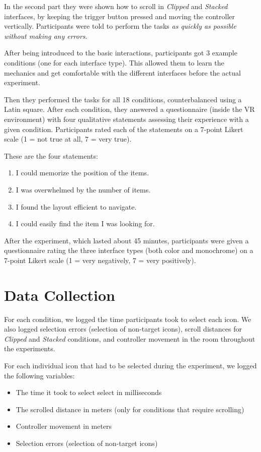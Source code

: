 \documentclass[nobib]{tufte-book} %
\begin{document}
In the second part they were shown how to scroll in \emph{Clipped} and \emph{Stacked} interfaces, by keeping the trigger button pressed and moving the controller vertically.
Participants were told to perform the tasks \emph{as quickly as possible without making any errors}.

After being introduced to the basic interactions, participants got 3 example conditions (one for each interface type). This allowed them to learn the mechanics and get comfortable with the different interfaces before the actual experiment.

Then they performed the tasks for all 18 conditions, counterbalanced using a Latin square. After each condition, they answered a questionnaire (inside the VR environment) with four qualitative statements assessing their experience with a given condition. Participants rated each of the statements on a 7-point Likert scale (1 = not true at all, 7 = very true).

These are the four statements:

\begin{enumerate}[label=\arabic*. , wide=0.5em,  leftmargin=*]
  \item I could memorize the position of the items.
  \item I was overwhelmed by the number of items.
  \item I found the layout efficient to navigate.
  \item I could easily find the item I was looking for.
\end{enumerate}

After the experiment, which lasted about 45 minutes, participants were given a questionnaire rating the three interface types (both color and monochrome) on a 7-point Likert scale (1 = very negatively, 7 = very positively).

\section{Data Collection}
For each condition, we logged the time participants took to select each icon. We also logged selection errors (selection of non-target icons), scroll distances for \emph{Clipped} and \emph{Stacked} conditions, and controller movement in the room throughout the experiments.

For each individual icon that had to be selected during the experiment, we logged the following variables:

\begin{itemize}
  \item The time it took to select select in milliseconds
  \item The scrolled distance in meters (only for conditions that require scrolling)
  \item Controller movement in meters
  \item Selection errors (selection of non-target icons)
\end{itemize}
\end{document}
